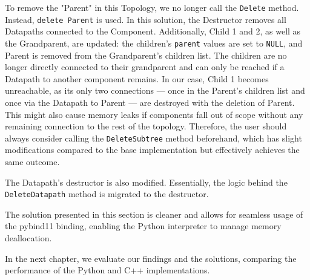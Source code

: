 \smallskip
To remove the "Parent" in this Topology, we no longer call the \verb|Delete| method. Instead, \verb|delete Parent| is used. In this solution, the Destructor removes all Datapaths connected to the Component. Additionally, Child 1 and 2, as well as the Grandparent, are updated: the children's \verb|parent| values are set to \texttt{NULL}, and Parent is removed from the Grandparent's children list. The children are no longer directly connected to their grandparent and can only be reached if a Datapath to another component remains. In our case, Child 1 becomes unreachable, as its only two connections — once in the Parent's children list and once via the Datapath to Parent — are destroyed with the deletion of Parent. This might also cause memory leaks if components fall out of scope without any remaining connection to the rest of the topology. Therefore, the user should always consider calling the \verb|DeleteSubtree| method beforehand, which has slight modifications compared to the base implementation but effectively achieves the same outcome.

The Datapath's destructor is also modified. Essentially, the logic behind the \verb|DeleteDatapath| method is migrated to the destructor.

The solution presented in this section is cleaner and allows for seamless usage of the pybind11 binding, enabling the Python interpreter to manage memory deallocation.

\smallskip
In the next chapter, we evaluate our findings and the solutions, comparing the performance of the Python and C++ implementations.
